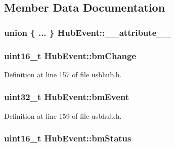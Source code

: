\subsection{\-Member \-Data \-Documentation}
\hypertarget{struct_hub_event_aa4dfbb7bfef618b3e43214e18790c017}{
\subsubsection[{\-\_\-\-\_\-attribute\-\_\-\-\_\-}]{\setlength{\rightskip}{0pt plus 5cm}union \{ ... \}   {\bf \-Hub\-Event\-::\-\_\-\-\_\-attribute\-\_\-\-\_\-}}}\label{struct_hub_event_aa4dfbb7bfef618b3e43214e18790c017}
\hypertarget{struct_hub_event_a9a5761abdc6e8ffc814ba8d3b5b9cd7f}{
\subsubsection[{bm\-Change}]{\setlength{\rightskip}{0pt plus 5cm}uint16\-\_\-t {\bf \-Hub\-Event\-::bm\-Change}}}\label{struct_hub_event_a9a5761abdc6e8ffc814ba8d3b5b9cd7f}


\-Definition at line 157 of file usbhub.\-h.

\hypertarget{struct_hub_event_aa7eab68768439ce3a208b3fa4c671a3c}{
\subsubsection[{bm\-Event}]{\setlength{\rightskip}{0pt plus 5cm}uint32\-\_\-t {\bf \-Hub\-Event\-::bm\-Event}}}\label{struct_hub_event_aa7eab68768439ce3a208b3fa4c671a3c}


\-Definition at line 159 of file usbhub.\-h.

\hypertarget{struct_hub_event_a40dc52f2eb375e6f7ace509a985525ac}{
\subsubsection[{bm\-Status}]{\setlength{\rightskip}{0pt plus 5cm}uint16\-\_\-t {\bf \-Hub\-Event\-::bm\-Status}}}\label{struct_hub_event_a40dc52f2eb375e6f7ace509a985525ac}


